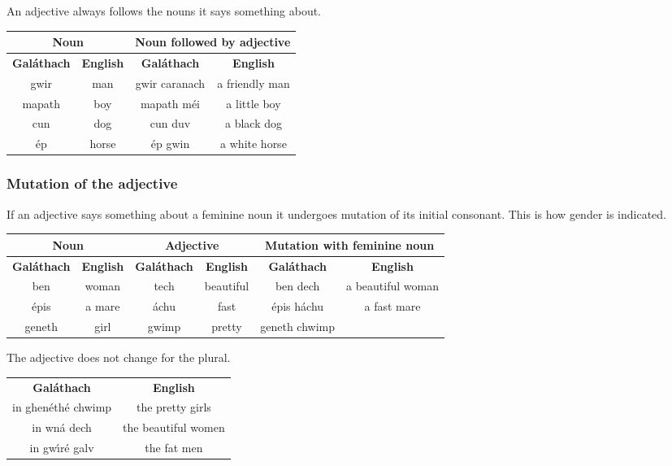 An adjective always follows the nouns it says something about.
\begin{table}[H]
\centering
\begin{tabular}{cccc}
  \toprule
  \multicolumn{2}{c}{\textbf{Noun}} & \multicolumn{2}{c}{\textbf{Noun followed by adjective}}\\
  \midrule
  \textbf{Gal\'{a}thach} & \textbf{English} & \textbf{Gal\'{a}thach} & \textbf{English}\\
  \cmidrule(lr){1-1}\cmidrule(lr){2-2}\cmidrule(lr){3-3}\cmidrule(lr){4-4}
  gwir & man & gwir caranach & a friendly man\\
  mapath & boy & mapath m\'{e}i & a little boy\\
  cun & dog & cun duv & a black dog\\
  \'{e}p & horse & \'{e}p gwin & a white horse\\
  \bottomrule
\end{tabular}
\label{examples_adjective_order}
\end{table}

\subsubsection{Mutation of the adjective}

If an adjective says something about a feminine noun it undergoes mutation of its initial consonant. This is how gender is indicated.
\begin{table}[H]
\centering
\begin{tabular}{cccccc}
  \toprule
  \multicolumn{2}{c}{\textbf{Noun}} & \multicolumn{2}{c}{\textbf{Adjective}} & \multicolumn{2}{c}{\textbf{Mutation with feminine noun}}\\
  \midrule
  \textbf{Gal\'{a}thach} & \textbf{English} & \textbf{Gal\'{a}thach} & \textbf{English} & \textbf{Gal\'{a}thach} & \textbf{English}\\
  \cmidrule(lr){1-1}\cmidrule(lr){2-2}\cmidrule(lr){3-3}\cmidrule(lr){4-4}\cmidrule(lr){5-5}\cmidrule(lr){6-6}
  ben & woman & tech & beautiful & ben dech & a beautiful woman\\
  \'{e}pis & a mare & \'{a}chu & fast & \'{e}pis h\'{a}chu & a fast mare\\
  geneth & girl & gwimp & pretty & geneth chwimp\\
  \bottomrule
\end{tabular}
\label{examples_adjective_order}
\end{table}

The adjective does not change for the plural.
\begin{table}[H]
\centering
\begin{tabular}{cc}
  \toprule
  \textbf{Gal\'{a}thach} & \textbf{English}\\
  \cmidrule(lr){1-1}\cmidrule(lr){2-2}
  in ghen\'{e}th\'{e} chwimp & the pretty girls\\
  in wn\'{a} dech & the beautiful women\\
  in gw\'{\i}r\'{e} galv & the fat men\\
  \bottomrule
\end{tabular}
\label{examples_no_mutation_for_plural}
\end{table}

